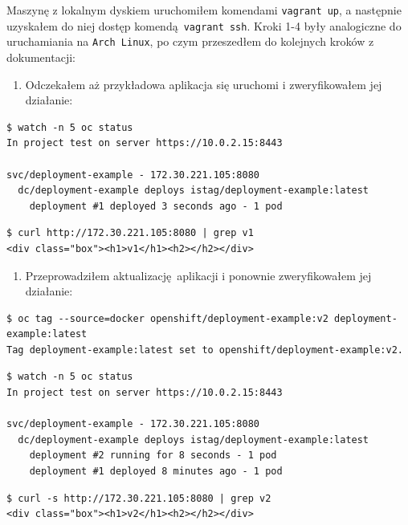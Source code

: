 \documentclass[a4paper,12pt,twoside,openany]{report}
\providecommand{\tightlist}{%
  \setlength{\itemsep}{0pt}\setlength{\parskip}{0pt}}
\newcommand{\passthrough}[1]{#1}
\begin{document}
Maszynę z lokalnym dyskiem uruchomiłem komendami
\passthrough{\lstinline!vagrant up!}, a następnie uzyskałem do niej
dostęp komendą~\passthrough{\lstinline!vagrant ssh!}. Kroki 1-4 były
analogiczne do uruchamiania na \passthrough{\lstinline!Arch Linux!}, po
czym przeszedłem do kolejnych kroków z dokumentacji:

\begin{enumerate}
\def\labelenumi{\arabic{enumi}.}
\setcounter{enumi}{4}
\tightlist
\item
  Odczekałem aż przykładowa aplikacja się uruchomi i zweryfikowałem jej
  działanie:
\end{enumerate}

\begin{lstlisting}
$ watch -n 5 oc status
In project test on server https://10.0.2.15:8443

svc/deployment-example - 172.30.221.105:8080
  dc/deployment-example deploys istag/deployment-example:latest 
    deployment #1 deployed 3 seconds ago - 1 pod
\end{lstlisting}

\begin{lstlisting}
$ curl http://172.30.221.105:8080 | grep v1
<div class="box"><h1>v1</h1><h2></h2></div>
\end{lstlisting}

\begin{enumerate}
\def\labelenumi{\arabic{enumi}.}
\setcounter{enumi}{5}
\tightlist
\item
  Przeprowadziłem aktualizację~aplikacji i ponownie zweryfikowałem jej
  działanie:
\end{enumerate}

\begin{lstlisting}
$ oc tag --source=docker openshift/deployment-example:v2 deployment-example:latest
Tag deployment-example:latest set to openshift/deployment-example:v2.
\end{lstlisting}

\begin{lstlisting}
$ watch -n 5 oc status
In project test on server https://10.0.2.15:8443

svc/deployment-example - 172.30.221.105:8080
  dc/deployment-example deploys istag/deployment-example:latest 
    deployment #2 running for 8 seconds - 1 pod
    deployment #1 deployed 8 minutes ago - 1 pod
\end{lstlisting}

\begin{lstlisting}
$ curl -s http://172.30.221.105:8080 | grep v2
<div class="box"><h1>v2</h1><h2></h2></div>
\end{lstlisting}
\end{document}
